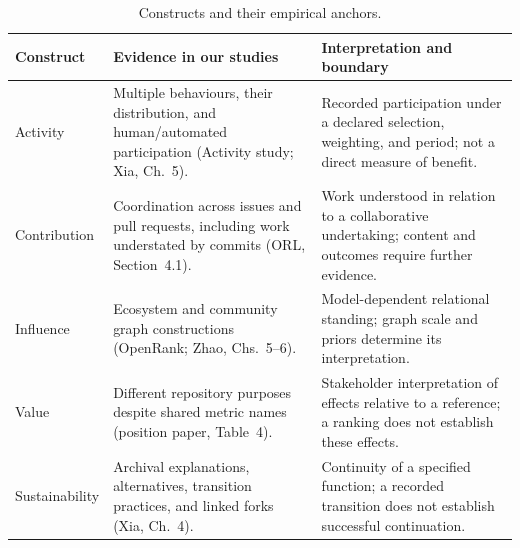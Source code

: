 \begin{table}[tbp]
\caption{Constructs and their empirical anchors.}
\label{tab:ch2-constructs}
\begingroup\fontsize{9.2}{11.8}\selectfont
\renewcommand{\arraystretch}{1.12}
\begin{tabularx}{\textwidth}{@{}>{\raggedright\arraybackslash}p{20mm}>{\raggedright\arraybackslash}X >{\raggedright\arraybackslash}X@{}}
\toprule
\textbf{Construct} & \textbf{Evidence in our studies} & \textbf{Interpretation and boundary}\\
\midrule
Activity & Multiple behaviours, their distribution, and human/automated participation (Activity study; Xia, Ch.~5). & Recorded participation under a declared selection, weighting, and period; not a direct measure of benefit.\\[5pt]
Contribution & Coordination across issues and pull requests, including work understated by commits (ORL, Section~4.1). & Work understood in relation to a collaborative undertaking; content and outcomes require further evidence.\\[5pt]
Influence & Ecosystem and community graph constructions (OpenRank; Zhao, Chs.~5--6). & Model-dependent relational standing; graph scale and priors determine its interpretation.\\[5pt]
Value & Different repository purposes despite shared metric names (position paper, Table~4). & Stakeholder interpretation of effects relative to a reference; a ranking does not establish these effects.\\[5pt]
Sustainability & Archival explanations, alternatives, transition practices, and linked forks (Xia, Ch.~4). & Continuity of a specified function; a recorded transition does not establish successful continuation.\\
\bottomrule
\end{tabularx}
\endgroup
{}
\end{table}
